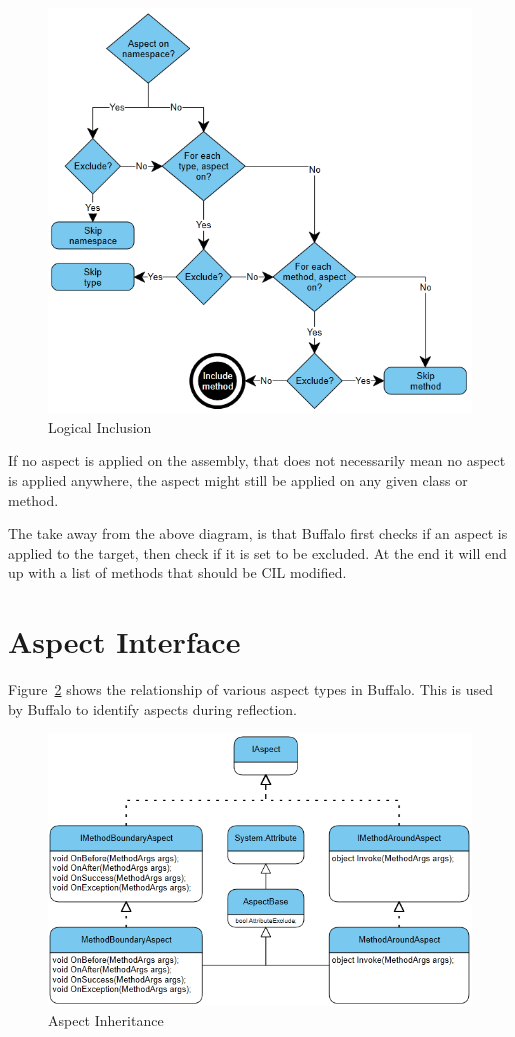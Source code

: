 \begin{figure}[H]
  \includegraphics[scale=1.0]{AspectLogicalInclusion.PNG}
  \centering
  \caption{Logical Inclusion\label{logical_inclusion}}
\end{figure}

If no aspect is applied on the assembly, that does not necessarily mean no aspect is applied anywhere, the aspect might still be applied on any given class or method.

The take away from the above diagram, is that Buffalo first checks if an aspect is applied to the target, then check if it is set to be excluded. At the end it will end up with a list of methods that should be CIL modified.

\section{Aspect Interface}

Figure~\ref{uml01} shows the relationship of various aspect types in Buffalo. This is used by Buffalo to identify aspects during reflection.

\begin{figure}[H]
  \includegraphics[scale=1.0]{Uml01.PNG}
  \centering
  \caption{Aspect Inheritance\label{uml01}}
\end{figure}

